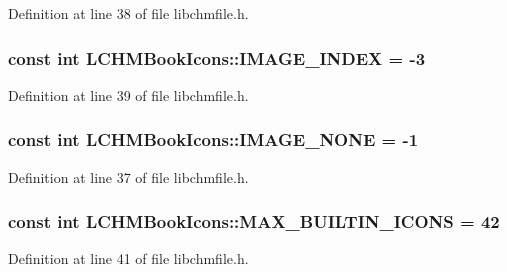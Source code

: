 Definition at line 38 of file libchmfile.\+h.

\hypertarget{namespaceLCHMBookIcons_a53f976419fbc01639c4cd57090e11c2f}{
\subsubsection[{I\+M\+A\+G\+E\+\_\+\+I\+N\+D\+E\+X}]{\setlength{\rightskip}{0pt plus 5cm}const int L\+C\+H\+M\+Book\+Icons\+::\+I\+M\+A\+G\+E\+\_\+\+I\+N\+D\+E\+X = -\/3}}\label{namespaceLCHMBookIcons_a53f976419fbc01639c4cd57090e11c2f}


Definition at line 39 of file libchmfile.\+h.

\hypertarget{namespaceLCHMBookIcons_a6061f38655b7c0a3bd7540c324aad060}{
\subsubsection[{I\+M\+A\+G\+E\+\_\+\+N\+O\+N\+E}]{\setlength{\rightskip}{0pt plus 5cm}const int L\+C\+H\+M\+Book\+Icons\+::\+I\+M\+A\+G\+E\+\_\+\+N\+O\+N\+E = -\/1}}\label{namespaceLCHMBookIcons_a6061f38655b7c0a3bd7540c324aad060}


Definition at line 37 of file libchmfile.\+h.

\hypertarget{namespaceLCHMBookIcons_aa8a657bb1bcac77ff0c2b590a1cd8e2e}{
\subsubsection[{M\+A\+X\+\_\+\+B\+U\+I\+L\+T\+I\+N\+\_\+\+I\+C\+O\+N\+S}]{\setlength{\rightskip}{0pt plus 5cm}const int L\+C\+H\+M\+Book\+Icons\+::\+M\+A\+X\+\_\+\+B\+U\+I\+L\+T\+I\+N\+\_\+\+I\+C\+O\+N\+S = 42}}\label{namespaceLCHMBookIcons_aa8a657bb1bcac77ff0c2b590a1cd8e2e}


Definition at line 41 of file libchmfile.\+h.


